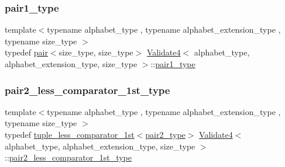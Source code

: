 \subsubsection{\texorpdfstring{pair1\+\_\+type}{pair1\_type}}
{\footnotesize\ttfamily template$<$typename alphabet\+\_\+type , typename alphabet\+\_\+extension\+\_\+type , typename size\+\_\+type $>$ \\
typedef \hyperlink{structpair}{pair}$<$size\+\_\+type, size\+\_\+type$>$ \hyperlink{class_validate4}{Validate4}$<$ alphabet\+\_\+type, alphabet\+\_\+extension\+\_\+type, size\+\_\+type $>$\+::\hyperlink{class_validate4_aaa2fcb80a05115eb4ca02ab23df8827e}{pair1\+\_\+type}\hspace{0.3cm}{\ttfamily [private]}}

\mbox{\label{class_validate4_af39ac6db5faa77a64ab49a75f92337a3}} 
\subsubsection{\texorpdfstring{pair2\+\_\+less\+\_\+comparator\+\_\+1st\+\_\+type}{pair2\_less\_comparator\_1st\_type}}
{\footnotesize\ttfamily template$<$typename alphabet\+\_\+type , typename alphabet\+\_\+extension\+\_\+type , typename size\+\_\+type $>$ \\
typedef \hyperlink{structtuple__less__comparator__1st}{tuple\+\_\+less\+\_\+comparator\+\_\+1st}$<$\hyperlink{class_validate4_a655c0013e7d26a0653ab8f4f96145bad}{pair2\+\_\+type}$>$ \hyperlink{class_validate4}{Validate4}$<$ alphabet\+\_\+type, alphabet\+\_\+extension\+\_\+type, size\+\_\+type $>$\+::\hyperlink{class_validate4_af39ac6db5faa77a64ab49a75f92337a3}{pair2\+\_\+less\+\_\+comparator\+\_\+1st\+\_\+type}\hspace{0.3cm}{\ttfamily [private]}}

\mbox{\label{class_validate4_ad945003027abfd152a0e177d7541580d}} 
